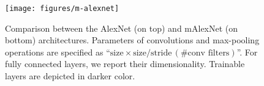 \begin{figure}
\texttt{[image: figures/m-alexnet]}
\caption{Comparison between the AlexNet (on top) and mAlexNet (on bottom) architectures.
Parameters of convolutions and max-pooling operations are specified as ``$\text{size} \times \text{size}/\text{stride}\, (\text{\# conv filters})$''.
For fully connected layers, we report their dimensionality.
Trainable layers are depicted in darker color.
}
\label{fig:mini:cnns}
\end{figure}



